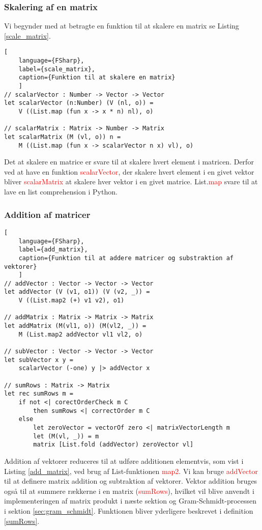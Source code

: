 \subsubsection{Skalering af en matrix}
Vi begynder med at betragte en funktion til at skalere en matrix se Listing \ref{scale_matrix}. 

\begin{lstlisting}[
    language={FSharp}, 
    label={scale_matrix}, 
    caption={Funktion til at skalere en matrix}
    ]
// scalarVector : Number -> Vector -> Vector
let scalarVector (n:Number) (V (nl, o)) = 
    V ((List.map (fun x -> x * n) nl), o)

// scalarMatrix : Matrix -> Number -> Matrix
let scalarMatrix (M (vl, o)) n = 
    M ((List.map (fun x -> scalarVector n x) vl), o)
\end{lstlisting}

Det at skalere en matrice er svare til at skalere hvert element i matricen. Derfor ved at have en funktion \textcolor{red}{scalarVector}, der skalere hvert element i en givet vektor bliver \textcolor{red}{scalarMatrix} at skalere hver vektor i en givet matrice. List.\textcolor{red}{map} svare til at lave en list comprehension i Python.


\subsubsection{Addition af matricer}
\begin{lstlisting}[
    language={FSharp}, 
    label={add_matrix}, 
    caption={Funktion til at addere matricer og substraktion af vektorer}
    ]
// addVector : Vector -> Vector -> Vector
let addVector (V (v1, o1)) (V (v2, _)) =
    V ((List.map2 (+) v1 v2), o1)

// addMatrix : Matrix -> Matrix -> Matrix
let addMatrix (M(vl1, o)) (M(vl2, _)) =
    M (List.map2 addVector vl1 vl2, o)

// subVector : Vector -> Vector -> Vector
let subVector x y =
    scalarVector (-one) y |> addVector x
    
// sumRows : Matrix -> Matrix
let rec sumRows m = 
    if not <| corectOrderCheck m C 
        then sumRows <| correctOrder m C
    else
        let zeroVector = vectorOf zero <| matrixVectorLength m
        let (M(vl, _)) = m
        matrix [List.fold (addVector) zeroVector vl]
\end{lstlisting}

Addition af vektorer reduceres til at udføre additionen elementvis, som vist i Listing \ref{add_matrix}, ved brug af List-funktionen \textcolor{red}{map2}. Vi kan bruge \textcolor{red}{addVector} til at definere matrix addition og subtraktion af vektorer. Vektor addition bruges også til at summere rækkerne i en matrix (\textcolor{red}{sumRows}), hvilket vil blive anvendt i implementeringen af matrix produkt i næste sektion og Gram-Schmidt-processen i sektion \ref{sec:gram_schmidt}. Funktionen bliver yderligere beskrevet i definition \ref{sumRows}.

